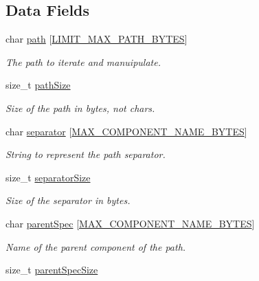 \subsection*{Data Fields}
\begin{DoxyCompactItemize}
\item 
char \hyperlink{struct_path_iterator__t_a63f175b8f9ef299f6666c9d0644affeb}{path} \mbox{[}\hyperlink{limit_8h_accd19a6264ef965c02f113dc01610e14}{L\+I\+M\+I\+T\+\_\+\+M\+A\+X\+\_\+\+P\+A\+T\+H\+\_\+\+B\+Y\+T\+ES}\mbox{]}
\begin{DoxyCompactList}\small\item\em The path to iterate and manuipulate. \end{DoxyCompactList}\item 
size\+\_\+t \hyperlink{struct_path_iterator__t_a03bd2d418970daf4e8fbd67327ed7669}{path\+Size}
\begin{DoxyCompactList}\small\item\em Size of the path in bytes, not chars. \end{DoxyCompactList}\item 
char \hyperlink{struct_path_iterator__t_a0b8006bf2a1114f3a8ff9385c55cc72f}{separator} \mbox{[}\hyperlink{path_iter_8c_a4ab86e7102448b00d4a7b23a07a6431a}{M\+A\+X\+\_\+\+C\+O\+M\+P\+O\+N\+E\+N\+T\+\_\+\+N\+A\+M\+E\+\_\+\+B\+Y\+T\+ES}\mbox{]}
\begin{DoxyCompactList}\small\item\em String to represent the path separator. \end{DoxyCompactList}\item 
size\+\_\+t \hyperlink{struct_path_iterator__t_aebae122f0fd185e15bb23113b32e557c}{separator\+Size}
\begin{DoxyCompactList}\small\item\em Size of the separator in bytes. \end{DoxyCompactList}\item 
char \hyperlink{struct_path_iterator__t_a6977e9f920bf2b7a9520754db17e2fc7}{parent\+Spec} \mbox{[}\hyperlink{path_iter_8c_a4ab86e7102448b00d4a7b23a07a6431a}{M\+A\+X\+\_\+\+C\+O\+M\+P\+O\+N\+E\+N\+T\+\_\+\+N\+A\+M\+E\+\_\+\+B\+Y\+T\+ES}\mbox{]}
\begin{DoxyCompactList}\small\item\em Name of the parent component of the path. \end{DoxyCompactList}\item 
size\+\_\+t \hyperlink{struct_path_iterator__t_a7e830a9f2beec716fb0c48d8a2bff45d}{parent\+Spec\+Size}

\end{DoxyCompactItemize}
